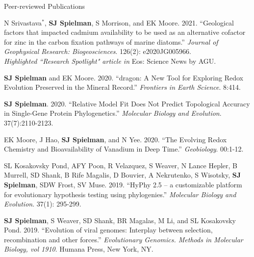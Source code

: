 \documentclass{resume} %
\begin{document}
\vspace*{0.35cm}
\begin{rSection}{Peer-reviewed Publications}
\vspace*{0.25cm}

\begin{etaremune}[leftmargin=1.5em]

\item N Srivastava$^\ast$, \textbf{SJ Spielman}, S Morrison, and EK Moore. 2021. ``Geological factors that impacted cadmium availability to be used as an alternative cofactor for zinc in the carbon fixation pathways of marine diatoms.'' \emph{Journal of Geophysical Research: Biogeosciences}. 126(2): e2020JG005966. \\
\emph{Highlighted ``Research Spotlight" article in} Eos: Science News by AGU.

\item \textbf{SJ Spielman} and EK Moore. 2020. ``dragon: A New Tool for Exploring Redox Evolution Preserved in the Mineral Record.'' \emph{Frontiers in Earth Science}. 8:414.

\item \textbf{SJ Spielman}. 2020. ``Relative Model Fit Does Not Predict Topological Accuracy in Single-Gene Protein Phylogenetics.'' \emph{Molecular Biology and Evolution}. 37(7):2110-2123.

\item EK Moore, J Hao, \textbf{SJ Spielman}, and N Yee. 2020. ``The Evolving Redox Chemistry and Bioavailability of Vanadium in Deep Time.'' \emph{Geobiology}. 00:1-12.

\item SL Kosakovsky Pond, AFY Poon, R Velazquez, S Weaver, N Lance Hepler, B Murrell, SD Shank, B Rife Magalis, D Bouvier, A Nekrutenko, S Wisotsky, \textbf{SJ Spielman}, SDW Frost, SV Muse. 2019. ``HyPhy 2.5 – a customizable platform for evolutionary hypothesis testing using phylogenies.'' \emph{Molecular Biology and Evolution}. 37(1): 295-299.

\item \textbf{SJ Spielman}, S Weaver, SD Shank, BR Magalas, M Li, and SL Kosakovsky Pond. 2019. ``Evolution of viral genomes: Interplay between selection, recombination and other forces.'' \emph{Evolutionary Genomics. Methods in Molecular Biology, vol 1910}. Humana Press, New York, NY.


\end{etaremune}
\end{rSection}
\end{document}
